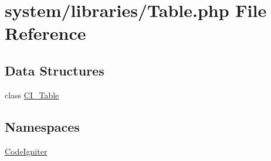 \hypertarget{_table_8php}{}\section{system/libraries/\+Table.php File Reference}
\label{_table_8php}
\subsection*{Data Structures}
\begin{DoxyCompactItemize}
\item 
class \mbox{\hyperlink{class_c_i___table}{C\+I\+\_\+\+Table}}
\end{DoxyCompactItemize}
\subsection*{Namespaces}
\begin{DoxyCompactItemize}
\item 
 \mbox{\hyperlink{namespace_code_igniter}{Code\+Igniter}}
\end{DoxyCompactItemize}
